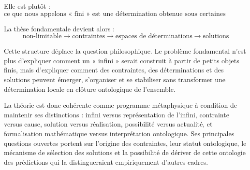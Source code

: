 \documentclass[11pt,a4paper]{article}
\begin{document}
Elle est plutôt :
\[
\boxed{
\text{ce que nous appelons « fini » est une détermination obtenue sous
certaines contraintes ; sa détermination n'implique pas, à elle seule,
une limitation ontologique ultime du fond du réel.}
}
\]

La thèse fondamentale devient alors :
\[
\boxed{
\text{non-limitable}
\rightarrow
\text{contraintes}
\rightarrow
\text{espaces de déterminations}
\rightarrow
\text{solutions}
}
\]

Cette structure déplace la question philosophique. Le problème fondamental
n'est plus d'expliquer comment un « infini » serait construit à partir de
petits objets finis, mais d'expliquer comment des contraintes, des
déterminations et des solutions peuvent émerger, s'organiser et se stabiliser
sans transformer une détermination locale en clôture ontologique de
l'ensemble.

La théorie est donc cohérente comme programme métaphysique à condition de
maintenir ses distinctions : infini versus représentation de l'infini,
contrainte versus cause, solution versus réalisation, possibilité versus
actualité, et formalisation mathématique versus interprétation ontologique.
Ses principales questions ouvertes portent sur l'origine des contraintes,
leur statut ontologique, le mécanisme de sélection des solutions et la
possibilité de dériver de cette ontologie des prédictions qui la distingueraient
empiriquement d'autres cadres.
\end{document}

